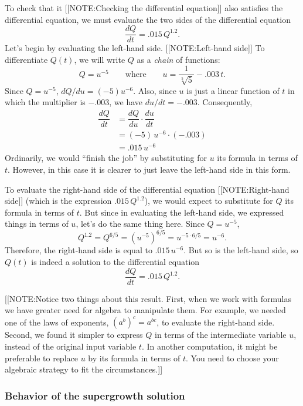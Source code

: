 	To check that it 
	[[NOTE:Checking the differential equation]]
also satisfies the differential equation, we must evaluate the two sides of the differential equation	
	\[
\dfrac{dQ}{dt} = .015\,Q^{1.2}.
\]
Let's begin by evaluating the left-hand side.  
	[[NOTE:Left-hand side]]
To differentiate $Q(t)$, we will write $Q$ as a {\em chain\/} of functions:
	\[
Q=u^{-5} \qquad \mbox{where} \qquad  
		u = \frac{1}{\sqrt[5]{5}}-.003 \,t.
\]
Since $Q=u^{-5}$, $dQ/du = (-5)u^{-6}$.  Also, since $u$ is just a linear function of $t$ in which the multiplier is $-.003$, we have $du/dt = -.003$.  Consequently,
	\begin{align*}
	\dfrac{dQ}{dt} &= \dfrac{dQ}{du} \cdot \dfrac{du}{dt} \\
		&= (-5)\,u^{-6} \cdot (-.003) \\
		&= .015 \, u^{-6} 
	\end{align*}
Ordinarily, we would ``finish the job'' by substituting for $u$ its formula in terms of $t$.  However, in this case it is clearer to just leave the left-hand side in this form.

	To evaluate the right-hand side of the differential equation
	[[NOTE:Right-hand side]]
(which is the expression $.015\,Q^{1.2}$), we would expect to substitute for $Q$ its formula in terms of $t$.  But since in evaluating the left-hand side, we expressed things in terms of $u$,  let's do the same thing here.  Since $Q = u^{-5}$,
	\[
Q^{1.2} = Q^{6/5} = (u^{-5})^{6/5} = u^{-5 \cdot 6/5}
		= u^{-6}.
\]
Therefore, the right-hand side is equal to $.015\,u^{-6}$.  But so is the left-hand side, so $Q(t)$ is indeed a solution to the differential equation
	\[
\dfrac{dQ}{dt} = .015\,Q^{1.2}.
\]

[[NOTE:Notice two things about this result.  First, when we work with
  formulas we have greater need for algebra to manipulate them.  For
  example, we needed one of the laws of exponents, $(a^b)^c = a^{bc}$,
  to evaluate the right-hand side.  Second, we found it simpler to
  express $Q$ in terms of the intermediate variable $u$, instead of
  the original input variable $t$.  In another computation, it might
  be preferable to replace $u$ by its formula in terms of $t$.  You
  need to choose your algebraic strategy to fit the circumstances.]]

\subsubsection{Behavior of the supergrowth solution}
\label{subsubsec:behavior-of-the-supergrowth-solution}

